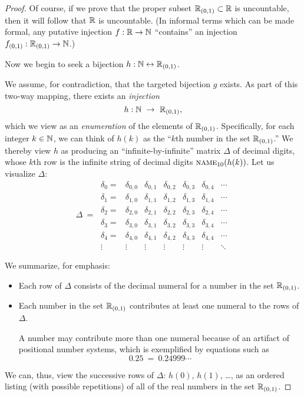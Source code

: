 \begin{proof}
\smallskip

Of course, if we prove that the proper subset $\mathbb{R}_{(0,1)} \subset \mathbb{R}$
is uncountable, then it will follow that $\mathbb{R}$ is uncountable.  (In
informal terms which can be made formal, any putative injection $f: \mathbb{R}
\rightarrow \mathbb{N}$ ``contains'' an injection $f_{(0,1)}: \mathbb{R}_{(0,1)} \rightarrow \mathbb{N}$.)

\bigskip

Now we begin to seek a bijection $h: \mathbb{N} \leftrightarrow \mathbb{R}_{(0,1)}$.

We assume, for contradiction, that the targeted bijection $g$ exists.
As part of this two-way mapping, there exists an {\em injection}
\[ 
h: \N \ \rightarrow \ \R_{(0,1)},
\]
which we view as an {\em enumeration} of the elements of $\mathbb{R}_{(0,1)}$.
Specifically, for each integer $k \in \mathbb{N}$, we can think of $h(k)$ as
the ``$k$th number in the set $\mathbb{R}_{(0,1)}$.''  We thereby view $h$ as
producing an ``infinite-by-infinite'' matrix $\Delta$ of decimal
digits, whose $k$th row is the infinite string of decimal digits
$\mbox{\sc name}_{10}(h(k))$.  Let us visualize $\Delta$:
\[ \Delta \ = \
\begin{array}{ccccccc}
\delta_0 = &
\delta_{0,0} & \delta_{0,1} & \delta_{0,2} & \delta_{0,3} &
	\delta_{0,4} & \cdots \\
\delta_1 = &
\delta_{1,0} & \delta_{1,1} & \delta_{1,2} & \delta_{1,3} &
	\delta_{1,4} & \cdots \\
\delta_2 = &
\delta_{2,0} & \delta_{2,1} & \delta_{2,2} & \delta_{2,3} &
	\delta_{2,4} & \cdots \\
\delta_3 = &
\delta_{3,0} & \delta_{3,1} & \delta_{3,2} & \delta_{3,3} &
	\delta_{3,4} & \cdots \\ 
\delta_4 = &
\delta_{4,0} & \delta_{4,1} & \delta_{4,2} & \delta_{4,3} &
	\delta_{4,4} & \cdots \\ 
\vdots &
\vdots  & \vdots  & \vdots  & \vdots  & \vdots  & \ddots
\end{array}
\]

\noindent We summarize, for emphasis:
\begin{itemize}
\item
Each row of $\Delta$ consists of the decimal numeral for a number in
the set $\mathbb{R}_{(0,1)}$.

\item
Each number in the set $\mathbb{R}_{(0,1)}$ contributes at least one numeral
to the rows of $\Delta$.

A number may contribute more than one numeral because of an artifact
of positional number systems, which is exemplified by equations such
as
\[ 0.25 \ = \ 0.24999\cdots \]
\end{itemize}
We can, thus, view the successive rows of $\Delta$: $h(0)$, $h(1)$,
\ldots, as an ordered listing (with possible repetitions) of all of
the real numbers in the set $\mathbb{R}_{(0,1)}$.


\end{proof}

